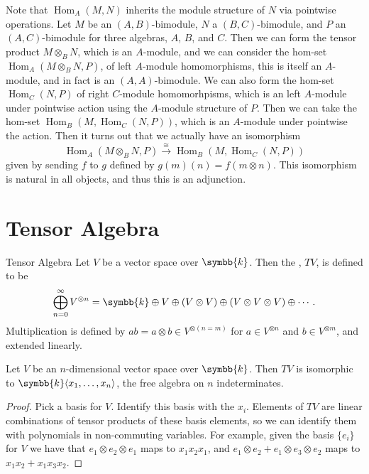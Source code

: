 \documentclass[fleqn]{NotesClass}
\renewcommand{\field}{\symbb{k}}
\DeclareMathOperator{\Hom}{Hom}
\newcommand{\isomorphic}{\cong}
\begin{document}
    Note that \(\Hom_A(M, N)\) inherits the module structure of \(N\) via pointwise operations.
    Let \(M\) be an \((A, B)\)-bimodule, \(N\) a \((B, C)\)-bimodule, and \(P\) an \((A, C)\)-bimodule for three algebras, \(A\), \(B\), and \(C\).
    Then we can form the tensor product \(M \otimes_B N\), which is an \(A\)-module, and we can consider the hom-set \(\Hom_A(M \otimes_B N, P)\), of left \(A\)-module homomorphisms, this is itself an \(A\)-module, and in fact is an \((A, A)\)-bimodule.
    We can also form the hom-set \(\Hom_C(N, P)\) of right \(C\)-module homomorhpisms, which is an left \(A\)-module under pointwise action using the \(A\)-module structure of \(P\).
    Then we can take the hom-set \(\Hom_B(M, \Hom_C(N, P))\), which is an \(A\)-module under pointwise the action.
    Then it turns out that we actually have an isomorphism
    \begin{equation}
        \Hom_A(M \otimes_B N, P) \xrightarrow{\isomorphic} \Hom_B(M, \Hom_C(N, P))
    \end{equation}
    given by sending \(f\) to \(g\) defined by \(g(m)(n) = f(m \otimes n)\).
    This isomorphism is natural in all objects, and thus this is an adjunction.
    
    \section{Tensor Algebra}
    \begin{dfn}{Tensor Algebra}{}
        Let \(V\) be a vector space over \(\field\).
        Then the , \(TV\), is defined to be
        \begin{equation}
            \bigoplus_{n=0}^{\infty} V^{\otimes n} = \field \oplus V \oplus (V \otimes V) \oplus (V \otimes V \otimes V) \oplus \dotsb.
        \end{equation}
        Multiplication is defined by \(ab = a \otimes b \in V^{\otimes(n = m)}\) for \(a \in V^{\otimes n}\) and \(b \in V^{\otimes m}\), and extended linearly.
    \end{dfn}
    
    \begin{lma}{}{}
        Let \(V\) be an \(n\)-dimensional vector space over \(\field\).
        Then \(TV\) is isomorphic to \(\field\langle x_1, \dotsc, x_n \rangle\), the free algebra on \(n\) indeterminates.
        \begin{proof}
            Pick a basis for \(V\).
            Identify this basis with the \(x_i\).
            Elements of \(TV\) are linear combinations of tensor products of these basis elements, so we can identify them with polynomials in non-commuting variables.
            For example, given the basis \(\{e_i\}\) for \(V\) we have that \(e_1 \otimes e_2 \otimes e_1\) maps to \(x_1x_2x_1\), and \(e_1 \otimes e_2 + e_1 \otimes e_3 \otimes e_2\) maps to \(x_1x_2 + x_1x_3x_2\).
        \end{proof}
    \end{lma}
    
\end{document}
